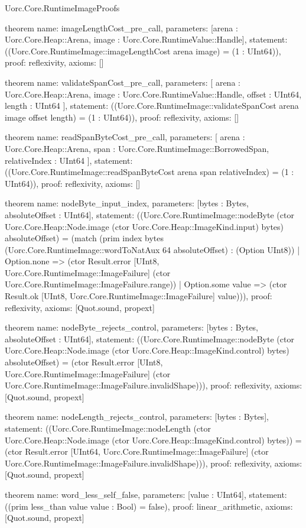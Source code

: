 \begin{lexlean}{Uorc.Core.RuntimeImageProofs}
\begin{semanticmodule}
theorem{
  name: imageLengthCost_pre_call,
  parameters: [arena : Uorc.Core.Heap::Arena, image : Uorc.Core.RuntimeValue::Handle],
  statement: ((Uorc.Core.RuntimeImage::imageLengthCost arena image) = (1 : UInt64)),
  proof: reflexivity{},
  axioms: []
}

theorem{
  name: validateSpanCost_pre_call,
  parameters: [
    arena : Uorc.Core.Heap::Arena,
    image : Uorc.Core.RuntimeValue::Handle,
    offset : UInt64,
    length : UInt64
  ],
  statement: ((Uorc.Core.RuntimeImage::validateSpanCost arena image offset length) = (1 : UInt64)),
  proof: reflexivity{},
  axioms: []
}

theorem{
  name: readSpanByteCost_pre_call,
  parameters: [
    arena : Uorc.Core.Heap::Arena,
    span : Uorc.Core.RuntimeImage::BorrowedSpan,
    relativeIndex : UInt64
  ],
  statement: ((Uorc.Core.RuntimeImage::readSpanByteCost arena span relativeIndex) = (1 : UInt64)),
  proof: reflexivity{},
  axioms: []
}

theorem{
  name: nodeByte_input_index,
  parameters: [bytes : Bytes, absoluteOffset : UInt64],
  statement: ((Uorc.Core.RuntimeImage::nodeByte (ctor Uorc.Core.Heap::Node.image (ctor Uorc.Core.Heap::ImageKind.input) bytes) absoluteOffset) = (match (prim index bytes (Uorc.Core.RuntimeImage::wordToNatAux 64 absoluteOffset) : (Option UInt8))
    | Option.none => (ctor Result.error [UInt8, Uorc.Core.RuntimeImage::ImageFailure] (ctor Uorc.Core.RuntimeImage::ImageFailure.range))
    | Option.some value => (ctor Result.ok [UInt8, Uorc.Core.RuntimeImage::ImageFailure] value))),
  proof: reflexivity{},
  axioms: [Quot.sound, propext]
}

theorem{
  name: nodeByte_rejects_control,
  parameters: [bytes : Bytes, absoluteOffset : UInt64],
  statement: ((Uorc.Core.RuntimeImage::nodeByte (ctor Uorc.Core.Heap::Node.image (ctor Uorc.Core.Heap::ImageKind.control) bytes) absoluteOffset) = (ctor Result.error [UInt8, Uorc.Core.RuntimeImage::ImageFailure] (ctor Uorc.Core.RuntimeImage::ImageFailure.invalidShape))),
  proof: reflexivity{},
  axioms: [Quot.sound, propext]
}

theorem{
  name: nodeLength_rejects_control,
  parameters: [bytes : Bytes],
  statement: ((Uorc.Core.RuntimeImage::nodeLength (ctor Uorc.Core.Heap::Node.image (ctor Uorc.Core.Heap::ImageKind.control) bytes)) = (ctor Result.error [UInt64, Uorc.Core.RuntimeImage::ImageFailure] (ctor Uorc.Core.RuntimeImage::ImageFailure.invalidShape))),
  proof: reflexivity{},
  axioms: [Quot.sound, propext]
}

theorem{
  name: word_less_self_false,
  parameters: [value : UInt64],
  statement: ((prim less_than value value : Bool) = false),
  proof: linear_arithmetic{},
  axioms: [Quot.sound, propext]
}


\end{semanticmodule}
\end{lexlean}
